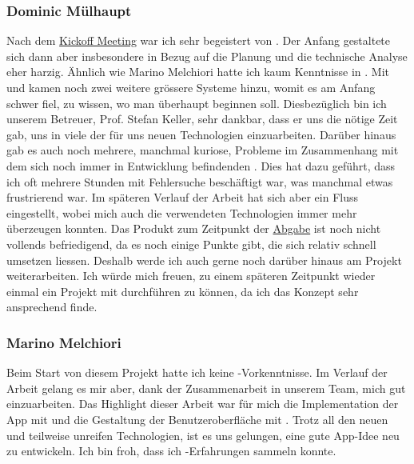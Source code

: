 \subsubsection{Dominic Mülhaupt}
Nach dem \hyperref[pm-ms1]{Kickoff Meeting} war ich sehr begeistert von \kort{}.
Der Anfang gestaltete sich dann aber insbesondere in Bezug auf die Planung und die technische Analyse eher harzig.
Ähnlich wie Marino Melchiori hatte ich kaum Kenntnisse in .
Mit  und  kamen noch zwei weitere grössere Systeme hinzu, womit es am Anfang schwer fiel, zu wissen, wo man überhaupt beginnen soll.
Diesbezüglich bin ich unserem Betreuer, Prof. Stefan Keller, sehr dankbar, dass er uns die nötige Zeit gab, uns in viele der für uns neuen Technologien einzuarbeiten.\newline
Darüber hinaus gab es auch noch mehrere, manchmal kuriose, Probleme im Zusammenhang mit dem sich noch immer in Entwicklung befindenden .
Dies hat dazu geführt, dass ich oft mehrere Stunden mit Fehlersuche beschäftigt war, was manchmal etwas frustrierend war.
Im späteren Verlauf der Arbeit hat sich aber ein Fluss eingestellt, wobei mich auch die verwendeten Technologien immer mehr überzeugen konnten.
Das Produkt zum Zeitpunkt der \hyperref[pm-ms7]{Abgabe} ist noch nicht vollends befriedigend, da es noch einige Punkte gibt, die sich relativ schnell umsetzen liessen.
Deshalb werde ich auch gerne noch darüber hinaus am Projekt weiterarbeiten.\newline
Ich würde mich freuen, zu einem späteren Zeitpunkt wieder einmal ein Projekt mit  durchführen zu können, da ich das Konzept sehr ansprechend finde.

\subsubsection{Marino Melchiori}
Beim Start von diesem Projekt hatte ich keine -Vorkenntnisse.
Im Verlauf der Arbeit gelang es mir aber, dank der Zusammenarbeit in unserem Team, mich gut  einzuarbeiten.
Das Highlight dieser Arbeit war für mich die Implementation der App mit  und die Gestaltung der Benutzeroberfläche mit .
Trotz all den neuen und teilweise unreifen Technologien, ist es uns gelungen, eine gute App-Idee neu zu entwickeln.
Ich bin froh, dass ich -Erfahrungen sammeln konnte.